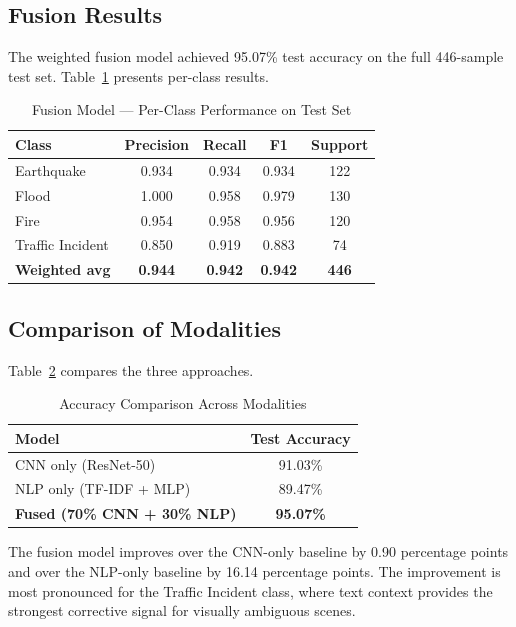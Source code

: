 \documentclass[conference]{IEEEtran}
\begin{document}
\subsection{Fusion Results}

The weighted fusion model achieved 95.07\% test accuracy on the full 446-sample test set. Table~\ref{tab:fusion_results} presents per-class results.

\begin{table}[h]
\caption{Fusion Model — Per-Class Performance on Test Set}
\label{tab:fusion_results}
\centering
\begin{tabular}{lcccc}
\toprule
\textbf{Class} & \textbf{Precision} & \textbf{Recall} & \textbf{F1} & \textbf{Support} \\
\midrule
Earthquake       & 0.934 & 0.934 & 0.934 & 122 \\
Flood            & 1.000 & 0.958 & 0.979 & 130 \\
Fire             & 0.954 & 0.958 & 0.956 & 120 \\
Traffic Incident & 0.850 & 0.919 & 0.883 & 74  \\
\midrule
\textbf{Weighted avg} & \textbf{0.944} & \textbf{0.942} & \textbf{0.942} & \textbf{446} \\
\bottomrule
\end{tabular}
\end{table}

\subsection{Comparison of Modalities}

Table~\ref{tab:comparison} compares the three approaches.

\begin{table}[h]
\caption{Accuracy Comparison Across Modalities}
\label{tab:comparison}
\centering
\begin{tabular}{lc}
\toprule
\textbf{Model} & \textbf{Test Accuracy} \\
\midrule
CNN only (ResNet-50)        & 91.03\% \\
NLP only (TF-IDF + MLP)     & 89.47\% \\
\textbf{Fused (70\% CNN + 30\% NLP)} & \textbf{95.07\%} \\
\bottomrule
\end{tabular}
\end{table}

The fusion model improves over the CNN-only baseline by 0.90 percentage points and over the NLP-only baseline by 16.14 percentage points. The improvement is most pronounced for the Traffic Incident class, where text context provides the strongest corrective signal for visually ambiguous scenes.
\end{document}
